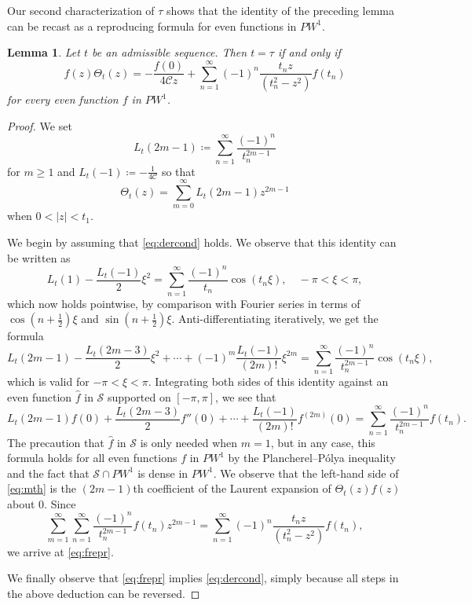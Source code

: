 \documentclass[12pt]{amsart}
\theoremstyle{plain}
\newtheorem{lemma}[theorem]{Lemma}
\numberwithin{equation}{section}
\theoremstyle{definition}
\newcommand{\Cone}{\mathscr{C}}
\begin{document}
Our second characterization of $\tau$  shows that the identity of the preceding lemma can be recast as a reproducing formula for even functions in $PW^1$.
\begin{lemma} \label{lem:frep} Let $t$ be an admissible sequence. Then $t=\tau$ if and only if
\begin{equation} \label{eq:frepr} f(z) \Theta_t(z) =- \frac{f(0)}{4\Cone z} + \sum_{n=1}^{\infty} (-1)^n \frac{t_n z}{(t_n^2-z^2)} f(t_n)\end{equation}
for every even function $f$ in $PW^1$.
\end{lemma}
\begin{proof}
We set
\[ L_t (2m-1)\coloneqq \sum_{n=1}^\infty \frac{(-1)^n}{t_n^{2m-1}} \]
for $m\ge 1$ and $L_t(-1)\coloneqq -\frac{1}{4\Cone}$ so that
\[ \Theta_t(z)=\sum_{m=0}^\infty L_t(2m-1) z^{2m-1} \]
when $0<|z|<t_1$.

We begin by assuming that \eqref{eq:dercond} holds. We observe that this identity can be written as
\[ L_t(1)-\frac{L_t(-1)}{2}\xi^2 =\sum_{n=1}^\infty \frac{(-1)^n}{t_n} \cos (t_n \xi), \quad -\pi < \xi < \pi ,\]
which now holds pointwise, by comparison with Fourier series in terms of $\cos(n+\frac12)\xi $  and $\sin(n+\frac12)\xi$.
Anti-differentiating iteratively, we get the formula
\[ L_t(2m-1)-\frac{L_t(2m-3)}{2}\xi^2 + \cdots + (-1)^m \frac{L_t(-1)}{(2m)!} \xi^{2m} = \sum_{n=1}^\infty \frac{(-1)^n}{t_n^{2m-1}} \cos (t_n \xi),  \]
which is valid for $-\pi<\xi <\pi$.
Integrating both sides of this identity against an even function $\widehat{f}$ in $\mathcal{S}$ supported on $[-\pi,\pi]$, we see that
\begin{equation} \label{eq:mth} L_t(2m-1)f(0)+\frac{L_t(2m-3)}{2}f''(0) + \cdots + \frac{L_t(-1)}{(2m)!} f^{(2m)}(0) = \sum_{n=1}^\infty \frac{(-1)^n}{t_n^{2m-1}} f(t_n). \end{equation}
The precaution that $\widehat{f}$ in $\mathcal{S}$ is only needed when $m=1$, but in any case,  this formula holds for all even functions $f$ in $PW^1$ by the Plancherel--P\'{o}lya inequality and the fact that $\mathcal{S}\cap PW^1$ is dense in $PW^1$.
We observe that the left-hand side of \eqref{eq:mth} is the $(2m-1)$th coefficient of the Laurent expansion of $\Theta_t(z)f(z)$ about $0$. Since
\[ \sum_{m=1}^\infty \sum_{n=1}^\infty \frac{(-1)^n}{t_n^{2m-1}} f(t_n) z^{2m-1} = \sum_{n=1}^{\infty} (-1)^n \frac{t_n z}{(t_n^2-z^2)} f(t_n), \]
we arrive at \eqref{eq:frepr}.

We finally observe that \eqref{eq:frepr} implies \eqref{eq:dercond}, simply because all steps in the above deduction can be reversed.
\end{proof}
\end{document}
